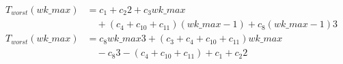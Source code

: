 \begin{subequations}
\label{eq:analyse-arlabeling-sortlabels}
\begin{align}
\label{eq:analyse-arlabeling-sortlabels-1}
T_{worst}(\mathit{wk\_max})& = c_{1} + c_{2}2 + c_{3}\mathit{wk\_max} \\
& \quad + (c_{4} + c_{10} + c_{11})(\mathit{wk\_max} - 1) + c_{8}(\mathit{wk\_max} - 1)3 \nonumber \\
\label{eq:analyse-arlabeling-sortlabels-2}
T_{worst}(\mathit{wk\_max})& = c_{8}\mathit{wk\_max}3 + (c_{3} + c_{4} + c_{10} + c_{11})\mathit{wk\_max}\\
& \quad - c_{8}3 - (c_{4} + c_{10} + c_{11}) + c_{1} + c_{2}2\nonumber
\end{align}
\end{subequations}
